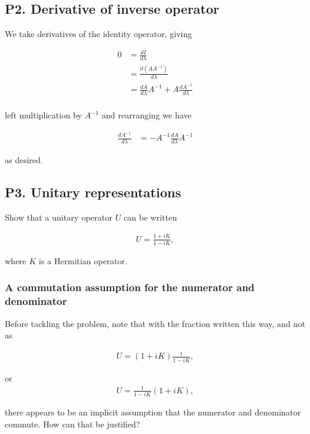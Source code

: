 \subsection{P2. Derivative of inverse operator}

We take derivatives of the identity operator, giving

\begin{align*}
0 
&= \frac{dI}{d\lambda} \\
&= \frac{d (A A^{-1})}{d\lambda} \\
&= \frac{d A }{d\lambda} A^{-1} + A \frac{d A^{-1}}{d\lambda} \\
\end{align*}

left multiplication by $A^{-1}$ and rearranging we have

\begin{align*}
\frac{d A^{-1}}{d\lambda} 
&= -A^{-1} \frac{d A }{d\lambda} A^{-1} 
\end{align*}

as desired.

\subsection{P3. Unitary representations}

Show that a unitary operator $U$ can be written

\begin{align*}
U = \frac{1 + iK}{1-iK},
\end{align*}

where $K$ is a Hermitian operator.

\subsubsection{A commutation assumption for the numerator and denominator}

Before tackling the problem, note that with the fraction written this way, and not as

\begin{align}\label{eqn:desaiDiracNotes:2}
U = (1 + iK)\frac{1}{1-iK},
\end{align}

or
\begin{align*}
U = \frac{1}{1-iK}(1 + iK),
\end{align*}

there appears to be an implicit assumption that the numerator and denominator commute.  How can that be justified?

